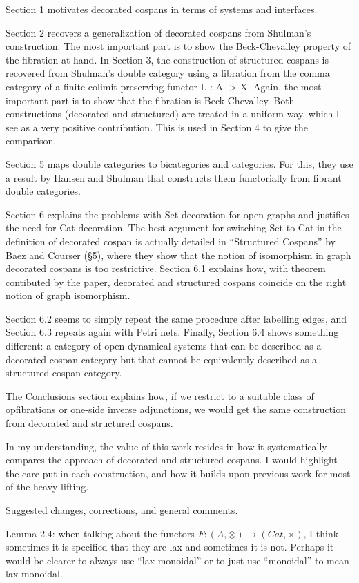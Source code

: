 \documentclass[reqno]{amsart}
\begin{document}
{Section 1 motivates decorated cospans in terms of systems and interfaces.

Section 2 recovers a generalization of decorated cospans from Shulman’s construction. The most important part is to show the Beck-Chevalley property 
of the fibration at hand. In Section 3, the construction of structured cospans is recovered from Shulman’s double category using a fibration from the 
comma category of a finite colimit preserving functor L : A -> X. Again, the most important part is to show that the fibration is Beck-Chevalley. Both 
constructions (decorated and structured) are treated in a uniform way, which I see as a very positive contribution. This is used in Section 4 to give 
the comparison.

Section 5 maps double categories to bicategories and categories. For this, they use a result by Hansen and Shulman that constructs them functorially 
from fibrant double categories.

Section 6 explains the problems with Set-decoration for open graphs and justifies the need for Cat-decoration. The best argument for switching Set to 
Cat in the definition of decorated cospan is actually detailed in “Structured Cospans” by Baez and Courser (§5), where they show that the notion of 
isomorphism in graph decorated cospans is too restrictive. Section 6.1 explains how, with theorem contibuted by the paper, decorated and structured 
cospans coincide on the right notion of graph isomorphism.

Section 6.2 seems to simply repeat the same procedure after labelling edges, and Section 6.3 repeats again with Petri nets. Finally, Section 6.4 shows 
something different: a category of open dynamical systems that can be described as a decorated cospan category but that cannot be equivalently 
described as a structured cospan category.

The Conclusions section explains how, if we restrict to a suitable class of opfibrations or one-side inverse adjunctions, we would get the same 
construction from decorated and structured cospans.

In my understanding, the value of this work resides in how it systematically compares the approach of decorated and structured cospans. I would 
highlight the care put in each construction, and how it builds upon previous work for most of the heavy lifting.

Suggested changes, corrections, and general comments.

Lemma 2.4: when talking about the functors $F : (A,\otimes)\to(Cat,\times)$, I think sometimes it is specified that they are lax and sometimes it is 
not. Perhaps it would be clearer to always use “lax monoidal” or to just use “monoidal” to mean lax monoidal.

}
\end{document}
